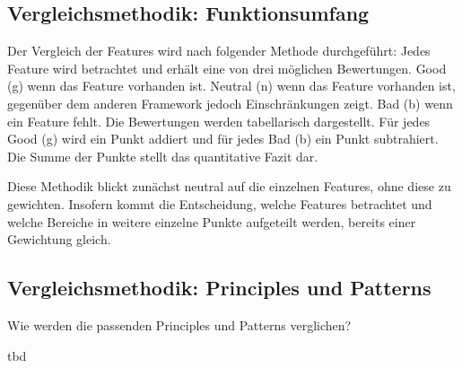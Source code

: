 \newpage

\subsection{Vergleichsmethodik: Funktionsumfang}
Der Vergleich der Features wird nach folgender Methode durchgeführt:
Jedes Feature wird betrachtet und erhält eine von drei möglichen Bewertungen.
Good (g) wenn das Feature vorhanden ist.
Neutral (n) wenn das Feature vorhanden ist, gegenüber dem anderen Framework jedoch Einschränkungen zeigt.
Bad (b) wenn ein Feature fehlt.
Die Bewertungen werden tabellarisch dargestellt.
Für jedes Good (g) wird ein Punkt addiert und für jedes Bad (b) ein Punkt subtrahiert.
Die Summe der Punkte stellt das quantitative Fazit dar.

Diese Methodik blickt zunächst neutral auf die einzelnen Features, ohne diese zu gewichten.
Insofern kommt die Entscheidung, welche Features betrachtet und welche Bereiche in weitere einzelne Punkte aufgeteilt werden, bereits einer Gewichtung gleich.

\subsection{Vergleichsmethodik: Principles und Patterns}
\color{red}
Wie werden die passenden Principles und Patterns verglichen?

tbd
\color{black}
